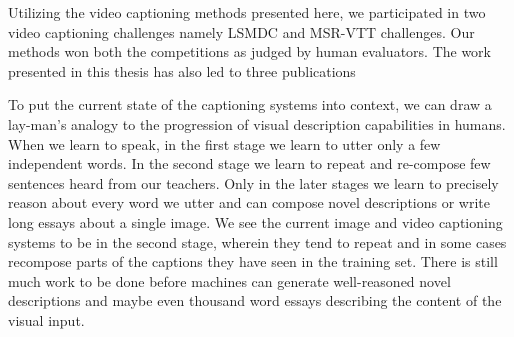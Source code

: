 Utilizing the video captioning methods presented here, we participated in two
video captioning challenges namely LSMDC and MSR-VTT challenges.
Our methods won both the competitions as judged by human evaluators.
The work presented in this thesis has also led to three
publications~\cite{shetty2015video,ShettyACMMM2016Wrk,ShettyACMMM2016}

To put the current state of the captioning systems into context, we can draw a
lay-man's analogy to the progression of visual description capabilities in
humans.
When we learn to speak, in the first stage we learn to utter only a few
independent words.
In the second stage we learn to repeat and re-compose few sentences heard from
our teachers.
Only in the later stages we learn to precisely reason about every word we utter
and can compose novel descriptions or write long essays about a single image. 
We see the current image and video captioning systems to be in the second stage,
wherein they tend to repeat and in some cases recompose parts of the captions
they have seen in the training set.
There is still much work to be done before machines can generate well-reasoned
novel descriptions and maybe even thousand word essays describing the content
of the visual input.


